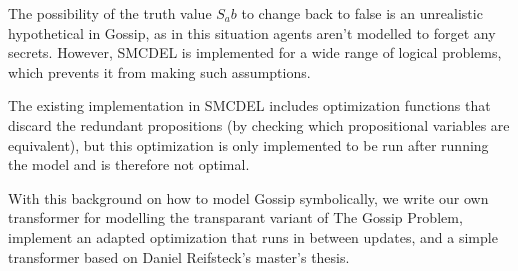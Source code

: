 

The possibility of the truth value $S_ab$ to change back to false is an unrealistic hypothetical in Gossip, as in this situation
agents aren't modelled to forget any secrets. However, SMCDEL is implemented for a wide range of logical problems, which prevents it
from making such assumptions.

The existing implementation in SMCDEL includes optimization functions that discard the redundant propositions
(by checking which propositional variables are equivalent), but this optimization is only implemented to be run after running the
model and is therefore not optimal.

With this background on how to model Gossip symbolically, we write our own transformer for modelling the transparant variant
of The Gossip Problem, implement an adapted optimization that runs in between updates, and a simple transformer based on Daniel
Reifsteck's master's thesis.
